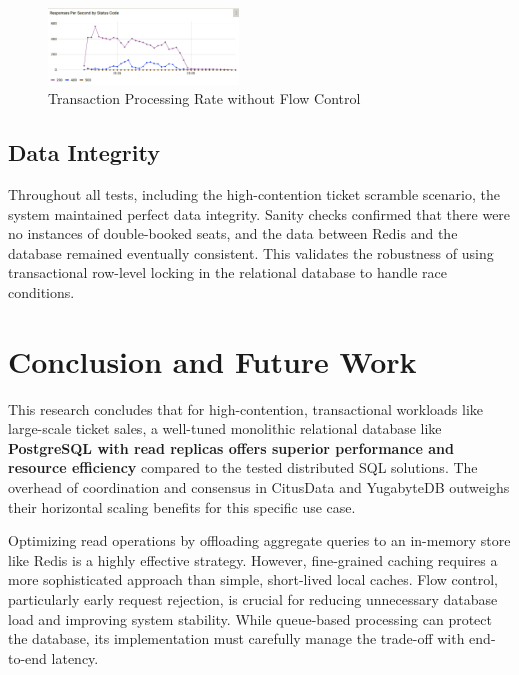 \begin{itemize}
          \begin{figure}[H]
              \centering
              \includegraphics[width=0.45\textwidth]{resources/chapter-4/rps-nofc-pg-stress-0.png}
              \caption{Transaction Processing Rate without Flow Control}
              \label{fig:rps-nofc-pg-stress-0}
          \end{figure}
\end{itemize}

\pagebreak

\subsection{Data Integrity}
Throughout all tests, including the high-contention ticket scramble scenario, the system maintained perfect data integrity. Sanity checks confirmed that there were no instances of double-booked seats, and the data between Redis and the database remained eventually consistent. This validates the robustness of using transactional row-level locking in the relational database to handle race conditions.

\section{Conclusion and Future Work}
\label{sec:conclusion}
This research concludes that for high-contention, transactional workloads like large-scale ticket sales, a well-tuned monolithic relational database like \textbf{PostgreSQL with read replicas offers superior performance and resource efficiency} compared to the tested distributed SQL solutions. The overhead of coordination and consensus in CitusData and YugabyteDB outweighs their horizontal scaling benefits for this specific use case.

Optimizing read operations by offloading aggregate queries to an in-memory store like Redis is a highly effective strategy. However, fine-grained caching requires a more sophisticated approach than simple, short-lived local caches. Flow control, particularly early request rejection, is crucial for reducing unnecessary database load and improving system stability. While queue-based processing can protect the database, its implementation must carefully manage the trade-off with end-to-end latency.


